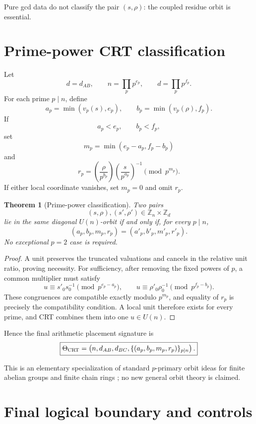 \documentclass[11pt,a4paper]{article}
\newtheorem{theorem}{Theorem}
\theoremstyle{definition}
\newcommand{\ZZ}{\mathbb Z}
\begin{document}
Pure gcd data do not classify the pair \((s,\rho)\): the coupled residue orbit is essential.

\section{Prime-power CRT classification}\label{sec:crt}

Let
\[
d=d_{AB},
\qquad
n=\prod_p p^{e_p},
\qquad
d=\prod_p p^{f_p}.
\]
For each prime \(p\mid n\), define
\[
\boxed{a_p=\min(v_p(s),e_p),}
\qquad
\boxed{b_p=\min(v_p(\rho),f_p).}
\]
If
\[
a_p<e_p,\qquad b_p<f_p,
\]
set
\[
\boxed{m_p=\min(e_p-a_p,f_p-b_p)}
\]
and
\[
\boxed{
r_p=
\left(\frac{\rho}{p^{b_p}}\right)
\left(\frac{s}{p^{a_p}}\right)^{-1}
\pmod{p^{m_p}}.
}
\]
If either local coordinate vanishes, set \(m_p=0\) and omit \(r_p\).

\begin{theorem}[Prime-power classification]\label{thm:crt}
Two pairs
\[
(s,\rho),(s',\rho')\in\ZZ_n\times\ZZ_d
\]
lie in the same diagonal \(U(n)\)-orbit if and only if, for every \(p\mid n\),
\[
\boxed{
(a_p,b_p,m_p,r_p)
=
(a'_p,b'_p,m'_p,r'_p).
}
\]
No exceptional \(p=2\) case is required.
\end{theorem}

\begin{proof}
A unit preserves the truncated valuations and cancels in the relative unit ratio, proving necessity.
For sufficiency, after removing the fixed powers of \(p\), a common multiplier must satisfy
\[
u\equiv s'_0s_0^{-1}\pmod{p^{e_p-a_p}},
\qquad
u\equiv \rho'_0\rho_0^{-1}\pmod{p^{f_p-b_p}}.
\]
These congruences are compatible exactly modulo
\(
p^{m_p}
\),
and equality of \(r_p\) is precisely the compatibility condition.
A local unit therefore exists for every prime, and CRT combines them into one \(u\in U(n)\).
\end{proof}

Hence the final arithmetic placement signature is
\[
\boxed{
\Theta_{\rm CRT}
=
\left(
n,d_{AB},d_{BC},
\{(a_p,b_p,m_p,r_p)\}_{p\mid n}
\right).
}
\]

This is an elementary specialization of standard \(p\)-primary orbit ideas for finite abelian groups and finite chain rings
\cite{DuttaPrasad2011,Cao2011}; no new general orbit theory is claimed.

\section{Final logical boundary and controls}\label{sec:boundary}
\end{document}
